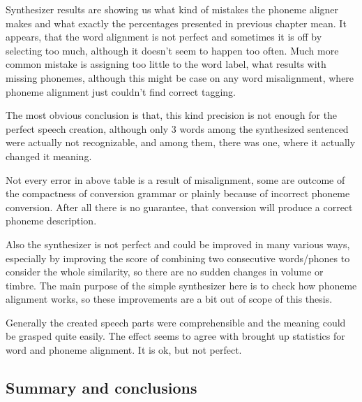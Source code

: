 \documentclass[12pt,a4paper,english]{article}
\begin{document}
Synthesizer results are showing us what kind of mistakes the phoneme aligner makes and what exactly the percentages presented in previous chapter mean. \newline
It appears, that the word alignment is not perfect and sometimes it is off by selecting too much, although it doesn't seem to happen too often. Much more common mistake is assigning too little to the word label, what results with missing phonemes, although this might be case on any word misalignment, where phoneme alignment just couldn't find correct tagging. \newline

The most obvious conclusion is that, this kind precision is not enough for the perfect speech creation, although only 3 words among the synthesized sentenced were actually not recognizable, and among them, there was one, where it actually changed it meaning. \newline

Not every error in above table is a result of misalignment, some are outcome of the compactness of conversion grammar or plainly because of incorrect phoneme conversion. After all there is no guarantee, that conversion will produce a correct phoneme description. \newline

Also the synthesizer is not perfect and could be improved in many various ways, especially by improving the score of combining two consecutive words/phones to consider the whole similarity, so there are no sudden changes in volume or timbre. The main purpose of the simple synthesizer here is to check how phoneme alignment works, so these improvements are a bit out of scope of this thesis. \newline

Generally the created speech parts were comprehensible and the meaning could be grasped quite easily. The effect seems to agree with brought up statistics for word and phoneme alignment. It is ok, but not perfect.


\newpage
\begin{center}
    \section{Summary and conclusions}
\end {center}
\setcounter{equation}{0}
\end{document}
